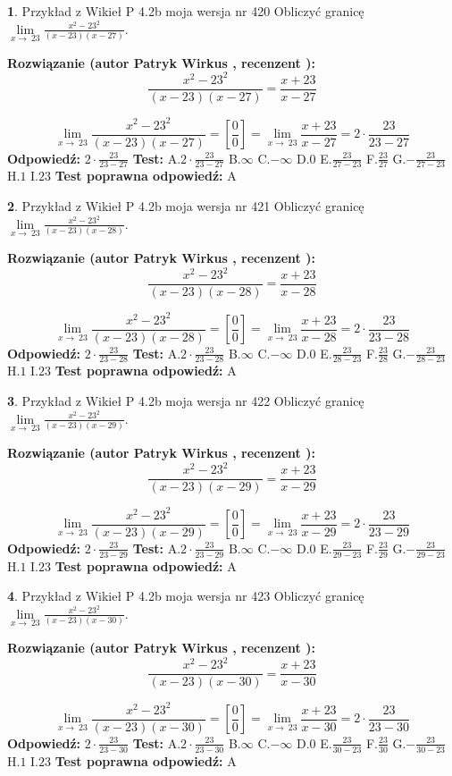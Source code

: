 \documentclass[12pt, a4paper]{article}
\theoremstyle{definition} %
\newtheorem{zad}{}
\newcommand{\zadStart}[1]{\begin{zad}#1\newline}
\newcommand{\zadStop}{\end{zad}}
\newcommand{\rozwStart}[2]{\noindent \textbf{Rozwiązanie (autor #1 , recenzent #2): }\newline}
\newcommand{\rozwStop}{\newline}
\newcommand{\odpStart}{\noindent \textbf{Odpowiedź:}\newline}
\newcommand{\odpStop}{\newline}
\newcommand{\testStart}{\noindent \textbf{Test:}\newline}
\newcommand{\testStop}{\newline}
\newcommand{\kluczStart}{\noindent \textbf{Test poprawna odpowiedź:}\newline}
\newcommand{\kluczStop}{\newline}
\begin{document}
\zadStart{Przykład z Wikieł P 4.2b moja wersja nr 420}
Obliczyć granicę $\lim\limits_{x\to\ 23}\frac{x^{2}-23^{2}}{(x-23)(x-27)}$.
\zadStop
\rozwStart{Patryk Wirkus}{}
$$\frac{x^{2}-23^{2}}{(x-23)(x-27)}=\frac{x+23}{x-27}$$

$$\lim\limits_{x\to\ 23}\frac{x^{2}-23^{2}}{(x-23)(x-27)}=[\frac{0}{0}]=\lim\limits_{x\to\ 23}\frac{x+23}{x-27}=2 \cdot \frac{23}{23-27}$$
\rozwStop
\odpStart
$2 \cdot \frac{23}{23-27}$
\odpStop
\testStart
A.$2 \cdot \frac{23}{23-27}$
B.$\infty$
C.$-\infty$
D.$0$
E.$\frac{23}{27-23}$
F.$\frac{23}{27}$
G.$-\frac{23}{27-23}$
H.$1$
I.$23$
\testStop
\kluczStart
A
\kluczStop



\zadStart{Przykład z Wikieł P 4.2b moja wersja nr 421}
Obliczyć granicę $\lim\limits_{x\to\ 23}\frac{x^{2}-23^{2}}{(x-23)(x-28)}$.
\zadStop
\rozwStart{Patryk Wirkus}{}
$$\frac{x^{2}-23^{2}}{(x-23)(x-28)}=\frac{x+23}{x-28}$$

$$\lim\limits_{x\to\ 23}\frac{x^{2}-23^{2}}{(x-23)(x-28)}=[\frac{0}{0}]=\lim\limits_{x\to\ 23}\frac{x+23}{x-28}=2 \cdot \frac{23}{23-28}$$
\rozwStop
\odpStart
$2 \cdot \frac{23}{23-28}$
\odpStop
\testStart
A.$2 \cdot \frac{23}{23-28}$
B.$\infty$
C.$-\infty$
D.$0$
E.$\frac{23}{28-23}$
F.$\frac{23}{28}$
G.$-\frac{23}{28-23}$
H.$1$
I.$23$
\testStop
\kluczStart
A
\kluczStop



\zadStart{Przykład z Wikieł P 4.2b moja wersja nr 422}
Obliczyć granicę $\lim\limits_{x\to\ 23}\frac{x^{2}-23^{2}}{(x-23)(x-29)}$.
\zadStop
\rozwStart{Patryk Wirkus}{}
$$\frac{x^{2}-23^{2}}{(x-23)(x-29)}=\frac{x+23}{x-29}$$

$$\lim\limits_{x\to\ 23}\frac{x^{2}-23^{2}}{(x-23)(x-29)}=[\frac{0}{0}]=\lim\limits_{x\to\ 23}\frac{x+23}{x-29}=2 \cdot \frac{23}{23-29}$$
\rozwStop
\odpStart
$2 \cdot \frac{23}{23-29}$
\odpStop
\testStart
A.$2 \cdot \frac{23}{23-29}$
B.$\infty$
C.$-\infty$
D.$0$
E.$\frac{23}{29-23}$
F.$\frac{23}{29}$
G.$-\frac{23}{29-23}$
H.$1$
I.$23$
\testStop
\kluczStart
A
\kluczStop



\zadStart{Przykład z Wikieł P 4.2b moja wersja nr 423}
Obliczyć granicę $\lim\limits_{x\to\ 23}\frac{x^{2}-23^{2}}{(x-23)(x-30)}$.
\zadStop
\rozwStart{Patryk Wirkus}{}
$$\frac{x^{2}-23^{2}}{(x-23)(x-30)}=\frac{x+23}{x-30}$$

$$\lim\limits_{x\to\ 23}\frac{x^{2}-23^{2}}{(x-23)(x-30)}=[\frac{0}{0}]=\lim\limits_{x\to\ 23}\frac{x+23}{x-30}=2 \cdot \frac{23}{23-30}$$
\rozwStop
\odpStart
$2 \cdot \frac{23}{23-30}$
\odpStop
\testStart
A.$2 \cdot \frac{23}{23-30}$
B.$\infty$
C.$-\infty$
D.$0$
E.$\frac{23}{30-23}$
F.$\frac{23}{30}$
G.$-\frac{23}{30-23}$
H.$1$
I.$23$
\testStop
\kluczStart
A
\kluczStop
\end{document}
